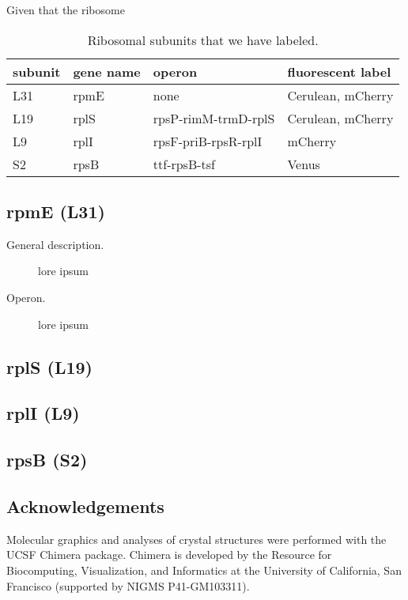 Given that the ribosome
			

\begin{table}                       
\begin{tabular}{ l l l l }
    \centering
    subunit & gene name & operon & fluorescent label \\ 
    \hline
    L31 & rpmE & none & Cerulean, mCherry \\ 
    L19 & rplS & rpsP-rimM-trmD-rplS & Cerulean, mCherry \\ 
    L9 & rplI & rpsF-priB-rpsR-rplI & mCherry \\ 
    S2 & rpsB & ttf-rpsB-tsf & Venus\\ 

\end{tabular}
    \caption{Ribosomal subunits that we have labeled.} \label{tab:ribosubunits}
\end{table}



\subsection{rpmE (L31)}
\begin{description}
    \item[General description.] lore ipsum
    \item[Operon.] lore ipsum
\end{description}



\subsection{rplS (L19)}


\subsection{rplI (L9)}


\subsection{rpsB (S2)}




\subsection{Acknowledgements}
Molecular graphics and analyses 
of crystal structures
%
were performed with the UCSF Chimera package. Chimera is developed by the Resource for Biocomputing, Visualization, and Informatics at the University of California, San Francisco (supported by NIGMS P41-GM103311). 





























